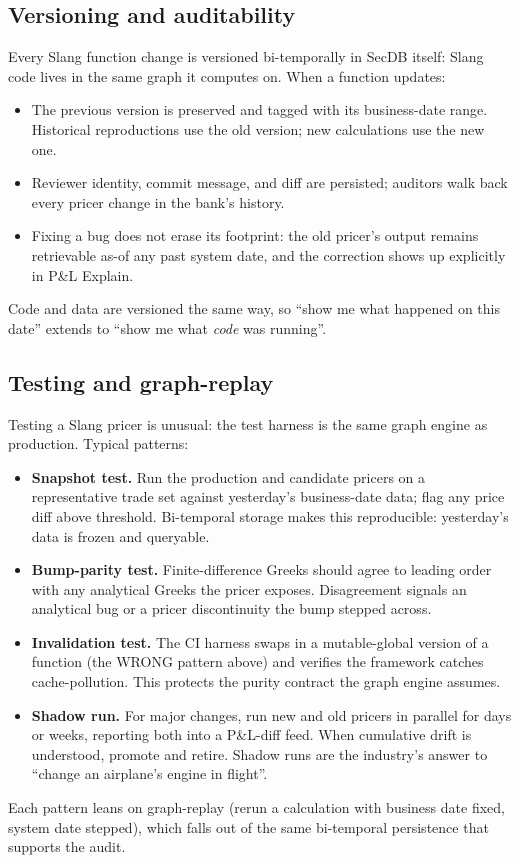 \subsection{Versioning and auditability}

Every Slang function change is versioned bi-temporally in SecDB
itself: Slang code lives in the same graph it computes on.
When a function updates:
\begin{itemize}
  \item The previous version is preserved and tagged with its
    business-date range.  Historical reproductions use the old
    version; new calculations use the new one.
  \item Reviewer identity, commit message, and diff are persisted;
    auditors walk back every pricer change in the bank's history.
  \item Fixing a bug does not erase its footprint: the old
    pricer's output remains retrievable as-of any past system
    date, and the correction shows up explicitly in P\&L Explain.
\end{itemize}
Code and data are versioned the same way, so ``show me what
happened on this date'' extends to ``show me what \emph{code} was
running''.

\subsection{Testing and graph-replay}
\label{sec:testing}

Testing a Slang pricer is unusual: the test harness is the same
graph engine as production.  Typical patterns:
\begin{itemize}
  \item \textbf{Snapshot test.}  Run the production and candidate
    pricers on a representative trade set against yesterday's
    business-date data; flag any price diff above threshold.
    Bi-temporal storage makes this reproducible: yesterday's
    data is frozen and queryable.
  \item \textbf{Bump-parity test.}  Finite-difference Greeks
    should agree to leading order with any analytical Greeks the
    pricer exposes.  Disagreement signals an analytical bug or a
    pricer discontinuity the bump stepped across.
  \item \textbf{Invalidation test.}  The CI harness swaps in a
    mutable-global version of a function (the WRONG pattern
    above) and verifies the framework catches cache-pollution.
    This protects the purity contract the graph engine assumes.
  \item \textbf{Shadow run.}  For major changes, run new and old
    pricers in parallel for days or weeks, reporting both into a
    P\&L-diff feed.  When cumulative drift is understood, promote
    and retire.  Shadow runs are the industry's answer to
    ``change an airplane's engine in flight''.
\end{itemize}
Each pattern leans on graph-replay (rerun a calculation with
business date fixed, system date stepped), which falls out of
the same bi-temporal persistence that supports the audit.

